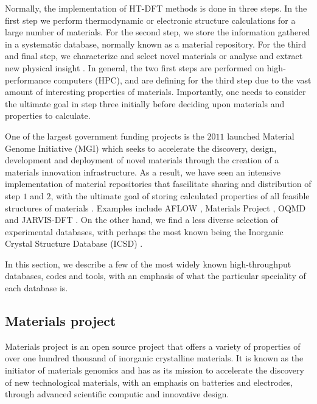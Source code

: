 Normally, the implementation of HT-DFT methods is done in three steps. In the first step we perform thermodynamic or electronic structure calculations for a large number of materials. For the second step, we store the information gathered in a systematic database, normally known as a material repository. For the third and final step, we characterize and select novel materials or analyse and extract new physical insight \cite{Schleder2019}. In general, the two first steps are performed on high-performance computers (HPC), and are defining for the third step due to the vast amount of interesting properties of materials. Importantly, one needs to consider the ultimate goal in step three initially before deciding upon materials and properties to calculate.

One of the largest government funding projects is the $2011$ launched Material Genome Initiative (MGI) \cite{Warren2018} which seeks to accelerate the discovery, design, development and deployment of novel materials through the creation of a materials innovation infrastructure. As a result, we have seen an intensive implementation of material repositories that fascilitate sharing and distribution of step $1$ and $2$, with the ultimate goal of storing calculated properties of all feasible structures of materials \cite{Schuett2020}. Examples include AFLOW \cite{Curtarolo2012, Curtarolo2012a, Calderon2015}, Materials Project \cite{Jain2013}, OQMD \cite{Saal2013, Kirklin2015} and JARVIS-DFT \cite{Choudhary2020}. On the other hand, we find a less diverse selection of experimental databases, with perhaps the most known being the Inorganic Crystal Structure Database (ICSD) \cite{Allen1987}.

In this section, we describe a few of the most widely known high-throughput databases, codes and tools, with an emphasis of what the particular speciality of each database is.

\subsection{Materials project}

Materials project \cite{Jain2013} is an open source project that offers a variety of properties of over one hundred thousand of inorganic crystalline materials. It is known as the initiator of materials genomics and has as its mission to accelerate the discovery of new technological materials, with an emphasis on batteries and electrodes, through advanced scientific computic and innovative design.

